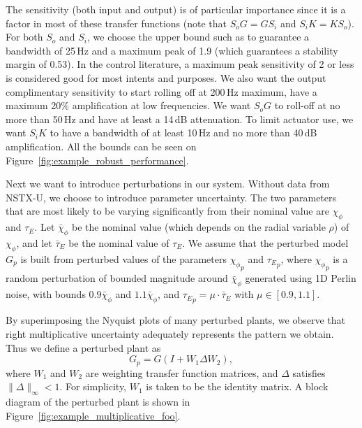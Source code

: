 \documentclass[12pt,lot, lof]{puthesis}
\begin{document}
The sensitivity (both input and output) is of particular importance since it is a factor in most of these transfer functions (note that $S_o G = G S_i$ and $S_i K = K S_o$).
For both $S_o$ and $S_i$, we choose the upper bound such as to guarantee a bandwidth of 25\,Hz and a maximum peak of 1.9 (which guarantees a stability margin of 0.53).
In the control literature, a maximum peak sensitivity of 2 or less is considered good for most intents and purposes.
We also want the output complimentary sensitivity to start rolling off at 200\,Hz maximum, have a maximum 20\% amplification at low frequencies.
We want $S_o G$ to roll-off at no more than 50\,Hz and have at least a 14\,dB attenuation.
To limit actuator use, we want $S_i K$ to have a bandwidth of at least 10\,Hz and no more than 40\,dB amplification.
All the bounds can be seen on Figure~\ref{fig:example_robust_performance}.

Next we want to introduce perturbations in our system.
Without data from NSTX-U, we choose to introduce parameter uncertainty.
The two parameters that are most likely to be varying significantly from their nominal value are $\chi_\phi$ and $\tau_E$.
Let $\bar{\chi}_\phi$ be the nominal value (which depends on the radial variable $\rho$) of $\chi_\phi$, and
let $\bar{\tau}_E$ be the nominal value of $\tau_E$.
We assume that the perturbed model $G_p$ is built from perturbed values of the parameters ${\chi_\phi}_p$ and ${\tau_E}_p$, where
${\chi_\phi}_p$ is a random perturbation of bounded magnitude around $\bar{\chi}_\phi$ generated using 1D Perlin noise, with bounds $0.9 \bar{\chi}_\phi$ and $1.1 \bar{\chi}_\phi$, and ${\tau_E}_p = \mu \cdot \bar{\tau}_E$ with $\mu \in [0.9,1.1]$.

By superimposing the Nyquist plots of many perturbed plants, we observe that right multiplicative uncertainty adequately represents the pattern we obtain.
Thus we define a perturbed plant as
\begin{equation} \label{eq:multiplicative}
	G_p = G (I + W_1 \Delta W_2),
\end{equation}
where $W_1$ and $W_2$ are weighting transfer function matrices, and $\Delta$ satisfies $\|\Delta\|_\infty < 1$.
For simplicity, $W_1$ is taken to be the identity matrix.
A block diagram of the perturbed plant is shown in Figure~\ref{fig:example_multiplicative_foo}.
\end{document}
